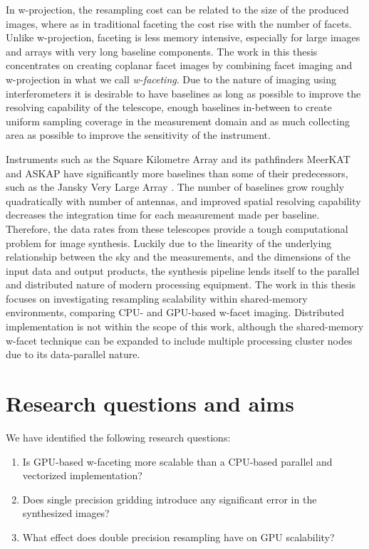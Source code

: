 In w-projection, the resampling cost can be related to the size of the produced images, where as in traditional faceting the cost rise with the number of facets. Unlike w-projection, faceting 
is less memory intensive, especially for large images and arrays with very long baseline components. The work in this thesis concentrates on creating coplanar facet images by combining facet 
imaging and w-projection in what we call \textit{w-faceting}. Due to the nature of imaging using interferometers it is desirable to have baselines as long as possible to improve the resolving
capability of the telescope, enough baselines in-between to create uniform sampling coverage in the measurement domain and as much collecting area as possible to improve the sensitivity of 
the instrument. 

Instruments such as the Square Kilometre Array \cite{carilli2004science} and its pathfinders MeerKAT \cite{booth2009meerkat} and ASKAP \cite{johnston2008science} have significantly more
baselines than some of their predecessors, such as the Jansky Very Large Array \cite{2041-8205-739-1-L1}. The number of baselines grow roughly quadratically with number of antennas, and improved spatial resolving 
capability decreases the integration time for each measurement made per baseline. Therefore, the data rates from these telescopes provide a tough computational problem for image synthesis. Luckily due to
the linearity of the underlying relationship between the sky and the measurements, and the dimensions of the input data and output products, the synthesis pipeline lends itself to the parallel and 
distributed nature of modern processing equipment. The work in this thesis focuses on investigating resampling scalability within shared-memory environments, comparing CPU- and GPU-based w-facet imaging.
Distributed implementation is not within the scope of this work, although the shared-memory w-facet technique can be expanded to include multiple processing cluster nodes due to its data-parallel 
nature.
\section{Research questions and aims}
We have identified the following research questions:
\begin{enumerate}
 \item Is GPU-based w-faceting more scalable than a CPU-based parallel and vectorized implementation?
 \item Does single precision gridding introduce any significant error in the synthesized images?
 \item What effect does double precision resampling have on GPU scalability?
\end{enumerate}

